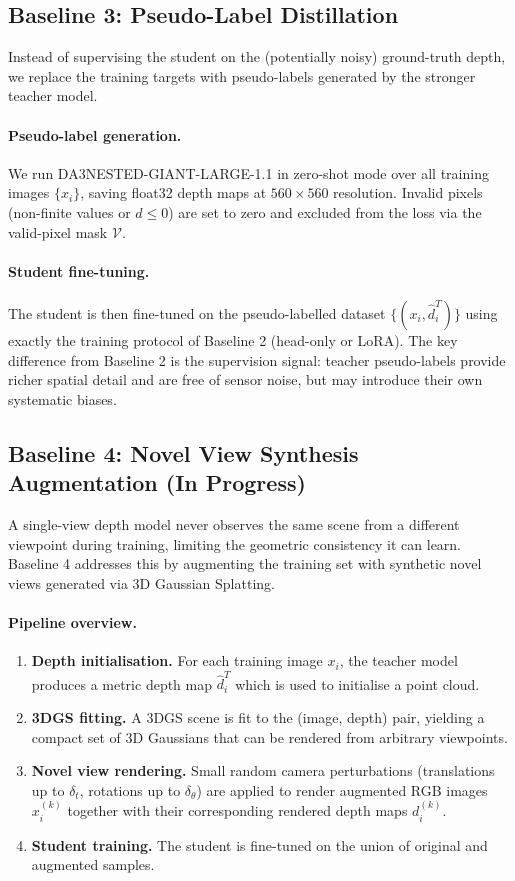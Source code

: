\documentclass{article}
\begin{document}
\subsection{Baseline 3: Pseudo-Label Distillation}

Instead of supervising the student on the (potentially noisy) ground-truth depth, we replace the training targets with pseudo-labels generated by the stronger teacher model.

\paragraph{Pseudo-label generation.}
We run DA3NESTED-GIANT-LARGE-1.1 in zero-shot mode over all training images $\{x_i\}$, saving float32 depth maps at $560 \times 560$ resolution.
Invalid pixels (non-finite values or $d \leq 0$) are set to zero and excluded from the loss via the valid-pixel mask $\mathcal{V}$.

\paragraph{Student fine-tuning.}
The student is then fine-tuned on the pseudo-labelled dataset $\{(x_i, \hat{d}^T_i)\}$ using exactly the training protocol of Baseline 2 (head-only or LoRA).
The key difference from Baseline 2 is the supervision signal: teacher pseudo-labels provide richer spatial detail and are free of sensor noise, but may introduce their own systematic biases.

\subsection{Baseline 4: Novel View Synthesis Augmentation (In Progress)}

A single-view depth model never observes the same scene from a different viewpoint during training, limiting the geometric consistency it can learn.
Baseline 4 addresses this by augmenting the training set with synthetic novel views generated via 3D Gaussian Splatting.

\paragraph{Pipeline overview.}
\begin{enumerate}
    \item \textbf{Depth initialisation.} For each training image $x_i$, the teacher model produces a metric depth map $\hat{d}^T_i$ which is used to initialise a point cloud.
    \item \textbf{3DGS fitting.} A 3DGS scene is fit to the (image, depth) pair, yielding a compact set of 3D Gaussians that can be rendered from arbitrary viewpoints.
    \item \textbf{Novel view rendering.} Small random camera perturbations (translations up to $\delta_t$, rotations up to $\delta_\theta$) are applied to render augmented RGB images $x_i^{(k)}$ together with their corresponding rendered depth maps $d_i^{(k)}$.
    \item \textbf{Student training.} The student is fine-tuned on the union of original and augmented samples.
\end{enumerate}
\end{document}
